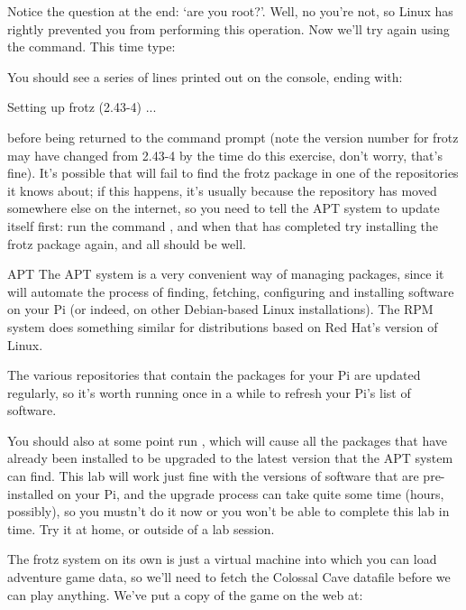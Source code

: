 Notice the question at the end: `are you root?'. Well, no you're not, so Linux has rightly prevented you from performing this operation. Now we'll try again using the  command. This time type:


You should see a series of lines printed out on the console, ending with:

\begin{ttoutenv}
Setting up frotz (2.43-4) ...
\end{ttoutenv}

\noindent before being returned to the command prompt (note the version number for frotz may have changed from 2.43-4 by the time do this exercise, don't worry, that's fine). It's possible that  will fail to find the frotz package in one of the repositories it knows about; if this happens, it's usually because the repository has moved somewhere else on the internet, so you need to tell the APT system to update itself first: run the command , and when that has completed try installing the frotz package again, and all should be well. 

\begin{rpi}{APT}
The APT system is a very convenient way of managing packages, since it will automate the process of finding, fetching, configuring and installing software on your Pi (or indeed, on other Debian-based Linux installations). The RPM system does something similar for distributions based on Red Hat's version of Linux.

The various repositories that contain the packages for your Pi are updated regularly, so it's worth running  once in a while to refresh your Pi's list of software. 

You should also at some point run , which will cause all the packages that have already been installed to be upgraded to the latest version that the APT system can find. This lab will work just fine with the versions of software that are pre-installed on your Pi, and the upgrade process can take quite some time (hours, possibly), so you mustn't do it now or you won't be able to complete this lab in time. Try it at home, or outside of a lab session. 
\end{rpi}

The frotz system on its own is just a virtual machine into which you can load adventure game data, so we'll need to fetch the Colossal Cave datafile before we can play anything. We've put a copy of the game on the web at:

